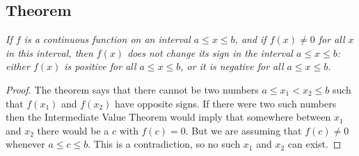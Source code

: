 \subsection{Theorem} %
\label{thm:nosignchangebetweenzeros}\itshape
If $f$ is a continuous function on an interval $a\leq x\leq b$, and if
$f(x)\neq0$ for all $x$ in this interval, then $f(x)$ does not change
its sign in the interval $a\leq x\leq b$: either $f(x)$ is
positive for all $a\leq x\leq b$, or it is negative for all $a\leq x\leq b$.
\upshape




\begin{proof}
  The theorem says that there cannot be two numbers $a \leq x_1<x_2 \leq b$ such
  that $f(x_1)$ and $f(x_2)$ have opposite signs.  If there were two
  such numbers then the Intermediate Value Theorem would imply that
  somewhere between $x_1$ and $x_2$ there would be a $c$ with $f(c)=0$.
  But we are assuming that $f(c)\neq0$ whenever $a \leq c \leq b$. This is a contradiction, so no such $x_1$ and $x_2$ can exist.
\end{proof}




